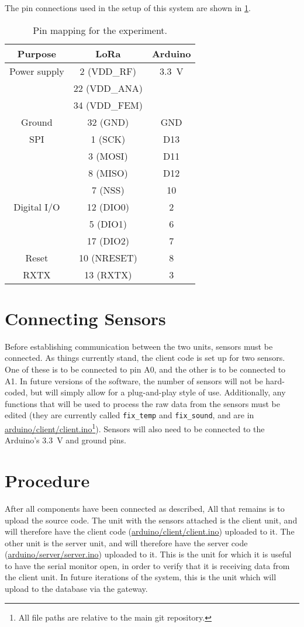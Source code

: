 \documentclass[11pt,onecolumn]{IEEEtran}
\begin{document}
The pin connections used in the setup of this system are shown in \cref{tab:pinmap}.
\begin{table}[ht]
  \centering
  \begin{tabular}{c | c | c}
    Purpose      & LoRa & Arduino \\ \hline
    Power supply & 2 (VDD\_RF)   & \SI{3.3}{\volt} \\
                 & 22 (VDD\_ANA) & \\
                 & 34 (VDD\_FEM) & \\ \hline
    Ground & 32 (GND) & GND \\ \hline
    SPI & 1 (SCK) & D13 \\
                 & 3 (MOSI) & D11 \\
                 & 8 (MISO) & D12 \\
                 & 7 (NSS) & 10 \\ \hline
    Digital I/O & 12 (DIO0) & 2 \\
                 & 5 (DIO1) & 6 \\
                 & 17 (DIO2) & 7 \\ \hline
    Reset & 10 (NRESET) & 8 \\ \hline
    RXTX & 13 (RXTX) & 3
  \end{tabular}
  \caption{Pin mapping for the experiment.}
  \label{tab:pinmap}
\end{table}

\section{Connecting Sensors}
\label{sec:setup}
Before establishing communication between the two units, sensors must be connected.
As things currently stand, the client code is set up for two sensors.  One of these is to be connected to pin A0, and the other is to be connected to A1.
In future versions of the software, the number of sensors will not be hard-coded, but will simply allow for a plug-and-play style of use.
Additionally, any functions that will be used to process the raw data from the sensors must be edited (they are currently called \lstinline[language=C++]{fix_temp} and \lstinline[language=C++]{fix_sound}, and are in \url{arduino/client/client.ino}\footnote{All file paths are relative to the main git repository.}).
Sensors will also need to be connected to the Arduino's \SI{3.3}{\volt} and ground pins.

\section{Procedure}
\label{sec:procedure}
After all components have been connected as described, All that remains is to upload the source code.
The unit with the sensors attached is the client unit, and will therefore have the client code (\url{arduino/client/client.ino}) uploaded to it.
The other unit is the server unit, and will therefore have the server code (\url{arduino/server/server.ino}) uploaded to it.
This is the unit for which it is useful to have the serial monitor open, in order to verify that it is receiving data from the client unit.
In future iterations of the system, this is the unit which will upload to the database via the gateway.
\end{document}
